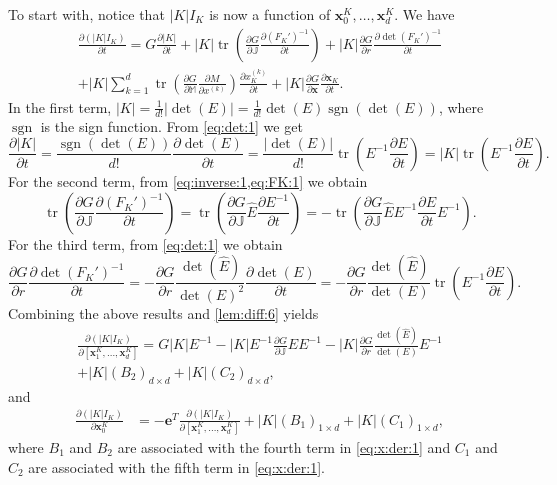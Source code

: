 \documentclass[american]{scrartcl}
\providecommand{\Abs}[1]{\left\lvert#1\right\rvert}
\providecommand{\V}[1]{\boldsymbol{#1}}
\providecommand{\p}[2]{\frac{\partial{}#1}{\partial{}#2}}
\providecommand{\M}{\mathbb{M}}
\providecommand{\J}{\mathbb{J}}
\theoremstyle{remark}
\begin{document}
To start with, notice that $\Abs{K} I_K$ is now a function of $\V{x}_0^K, \dotsc, \V{x}_d^K$.
We have
\begin{multline}
   \p{(\Abs{K} I_K)}{t}
       = G \p{\Abs{K}}{t}
         + \Abs{K} \operatorname{tr}\left( \p{G}{\J} \p{{(F_K')}^{-1}}{t}\right)
         + \Abs{K} \p{G}{r} \p{{\det(F_K')}^{-1}}{t}
  \\
         + \Abs{K} \sum_{k=1}^d \operatorname{tr}\left( \p{G}{\M} \p{M}{x^{(k)}} \right)
            \p{x_K^{(k)}}{t} 
         + \Abs{K} \p{G}{\V{x}} \p{\V{x}_K}{t}
   .
   \label{eq:x:der:1}
\end{multline}
In the first term, $\Abs{K} = \frac{1}{d!} \Abs{\det(E)} = \frac{1}{d!} \det(E) \operatorname{sgn}(\det(E))$, where $\operatorname{sgn}$ is the sign function.
From \cref{eq:det:1} we get
\[
   \p{\Abs{K}}{t}
      = \frac{\operatorname{sgn}(\det(E))}{d!} \p{\det(E)}{t}
      = \frac{\Abs{\det(E)}}{d!} \operatorname{tr}\left( E^{-1} \p{E}{t} \right) 
      = \Abs{K} \operatorname{tr} \left( E^{-1} \p{E}{t} \right)
   .
\]
For the second term, from \cref{eq:inverse:1,eq:FK:1} we obtain
\[
   \operatorname{tr}\left( \p{G}{\J} \p{ {(F_K')}^{-1}}{t} \right)
      = \operatorname{tr}\left ( \p{G}{\J} \hat{E} \p{E^{-1}}{t} \right)
      = - \operatorname{tr}\left( \p{G}{\J} \hat{E} E^{-1} \p{E}{t}E^{-1} \right)
   .
\]
For the third term, from \cref{eq:det:1} we obtain
\[
   \p{G}{r} \p{ {\det(F_K')}^{-1}}{t}
      = - \p{G}{r} \frac{\det(\hat{E})}{{\det(E)}^2} \p{\det(E)}{t}
      = - \p{G}{r} \frac{\det(\hat{E})}{\det(E)} \operatorname{tr}\left( E^{-1} \p{E}{t} \right)
   .
\]
Combining the above results and \cref{lem:diff:6} yields
\begin{multline}
   \p{(\Abs{K} I_K)}{[\V{x}_1^K,\dotsc,\V{x}_d^K]}
      = G \Abs{K}  E^{-1}
      - \Abs{K} E^{-1} \p{G}{\J} \hat{E} E^{-1}
      - \Abs{K} \p{G}{r} \frac{\det(\hat{E})}{\det(E)} E^{-1}
   \\
      + \Abs{K} {(B_2)}_{d\times d}
      + \Abs{K} {(C_2)}_{d\times d}
   ,
   \label{eq:x:der:2}
\end{multline}
and
\begin{align}
   \p{(\Abs{K}I_K)}{\V{x}_0^K} 
      &= - \V{e}^T \p{(\Abs{K}I_K)}{[\V{x}_1^K,\dotsc,\V{x}_d^K]}
         + \Abs{K} {(B_1)}_{1\times d}
         + \Abs{K} {(C_1)}_{1\times d}
   ,
   \label{eq:x:der:3}
\end{align}
where $B_1$ and $B_2$ are associated with the fourth term in \cref{eq:x:der:1} and $C_1$ and $C_2$ are associated with the fifth term in \cref{eq:x:der:1}.
\end{document}
